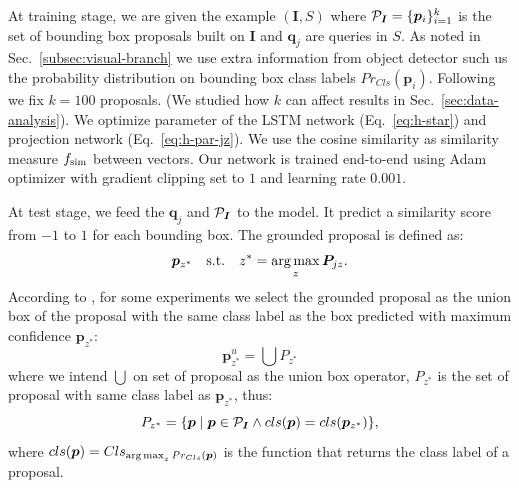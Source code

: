 At training stage, we are given the example $(\bm{I}, S)$ where
$\mathcal{P}_{\bm{I}} = \{ \bm{p}_i \}^k_{i=1}$ is the set of bounding box
proposals built on $\bm{I}$ and $\bm{q}_j$ are queries in $S$. As
noted in Sec.~\ref{subsec:visual-branch} we use extra information from
object detector such us the probability distribution on bounding box
class labels $Pr_{Cls}(\bm{p}_i)$. Following \cite{chen2018knowledge}
we fix $k = 100$ proposals. (We studied how $k$ can affect results in
Sec.~\ref{sec:data-analysis}). We optimize parameter of the LSTM
network (Eq.~\ref{eq:h-star}) and projection network
(Eq.~\ref{eq:h-par-jz}). We use the cosine similarity as similarity
measure $f_{\text{sim}}$ between vectors. Our network is trained end-to-end
using Adam optimizer with gradient clipping set to $1$ and learning
rate $0.001$.

At test stage, we feed the $\bm{q}_j$ and $\mathcal{P}_{\bm{I}}$ to the
model. It predict a similarity score from $-1$ to $1$ for each
bounding box. The grounded proposal is defined as:
\begin{equation}
  \bm{p}_{z^*} \quad \text{s.t.} \quad z^* = \operatorname*{arg\,max}_z \bm{P}_{jz}.
\end{equation}
According to \cite{wang2019phrase}, for some experiments we select the
grounded proposal as the union box of the proposal with the same class
label as the box predicted with maximum confidence $\bm{p}_{z^*}$:
\begin{equation}
  \bm{p}^u_{z^*} = \bigcup P_{z^*}
\end{equation}
where we intend $\bigcup$ on set of proposal as the union box
operator, $P_{z^*}$ is the set of proposal with same class label as
$\bm{p}_{z^*}$, thus:
\begin{equation}
  P_{z^*} = \{ \bm{p} \mid \bm{p} \in \mathcal{P}_{\bm{I}} \land cls(\bm{p}) = cls(\bm{p}_{z^*}) \},
\end{equation}
where $cls(\bm{p}) = Cls_{\operatorname*{arg\,max}_z Pr_{Cls}(\bm{p})}$ is the function
that returns the class label of a proposal.
